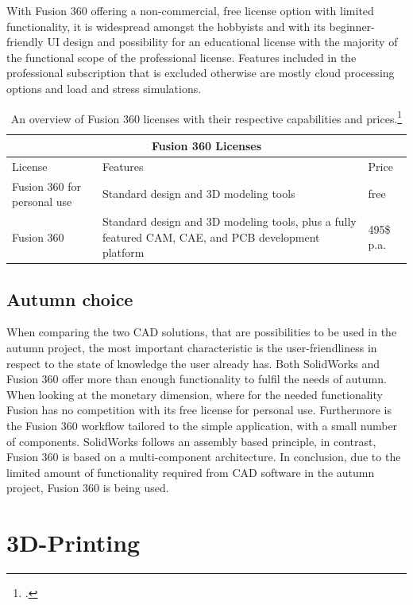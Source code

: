 With Fusion 360 offering a non-commercial, free license option with limited functionality, it is widespread amongst the hobbyists and with its beginner-friendly UI design and possibility for an educational license with the majority of the functional scope of the professional license. Features included in the professional subscription that is excluded otherwise are mostly cloud processing options and load and stress simulations.

\begin{table}
	\centering
	\begin{tabular}{ |p{3cm}||p{6cm}|p{3cm}|  }
		\hline
		\multicolumn{3}{|c|}{Fusion 360 Licenses} \\
		\hline
		License & Features & Price\\
		\hline
		Fusion 360 for personal use& Standard design and 3D modeling tools& free\\
		\hline
		Fusion 360& Standard design and 3D modeling tools, plus a fully featured CAM, CAE, and PCB development platform& 495\$ p.a.\\
		\hline
	\end{tabular}
	\caption{An overview of Fusion 360 licenses with their respective capabilities and prices.\footcite{autodeskFusionPersonalNoDate}}
\end{table}

\subsection{Autumn choice}

When comparing the two CAD solutions, that are possibilities to be used in the autumn project, the most important characteristic is the user-friendliness in respect to the state of knowledge the user already has. Both SolidWorks and Fusion 360 offer more than enough functionality to fulfil the needs of autumn. When looking at the monetary dimension, where for the needed functionality Fusion has no competition with its free license for personal use. Furthermore is the Fusion 360 workflow tailored to the simple application, with a small number of components. SolidWorks follows an assembly based principle, in contrast, Fusion 360 is based on a multi-component architecture.\newline
In conclusion, due to the limited amount of functionality required from CAD software in the autumn project, Fusion 360 is being used.

\section{3D-Printing}

